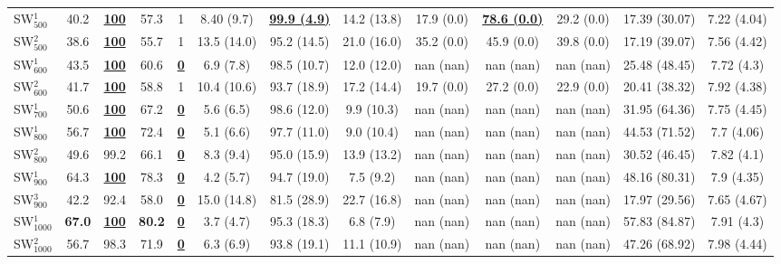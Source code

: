 \documentclass[a4paper,authoryear,review]{elsarticle}
\begin{document}
\begin{table}[]
\begin{adjustbox}{angle=90}
{\begin{tabular}{lcccccccccccc}
                SW$_{500}^{1}$ & 40.2 & {\ul \textbf{100}} & 57.3 & 1 & 8.40 (9.7) & {\ul \textbf{99.9 (4.9)}} & 14.2 (13.8) & 17.9 (0.0) & {\ul \textbf{78.6 (0.0)}} & 29.2 (0.0) & 17.39 (30.07) & 7.22 (4.04) \\
                SW$_{500}^{2}$ & 38.6 & {\ul \textbf{100}} & 55.7 & 1 & 13.5 (14.0) & 95.2 (14.5) & 21.0 (16.0) & 35.2 (0.0) & 45.9 (0.0) & 39.8 (0.0) & 17.19 (39.07) & 7.56 (4.42) \\
                SW$_{600}^{1}$ & 43.5 & {\ul \textbf{100}} & 60.6 & {\ul \textbf{0}} & 6.9 (7.8) & 98.5 (10.7) & 12.0 (12.0) & nan (nan) & nan (nan) & nan (nan) & 25.48 (48.45) & 7.72 (4.3) \\
                SW$_{600}^{2}$ & 41.7 & {\ul \textbf{100}} & 58.8 & 1 & 10.4 (10.6) & 93.7 (18.9) & 17.2 (14.4) & 19.7 (0.0) & 27.2 (0.0) & 22.9 (0.0) & 20.41 (38.32) & 7.92 (4.38) \\
                SW$_{700}^{1}$ & 50.6 & {\ul \textbf{100}} & 67.2 & {\ul \textbf{0}} & 5.6 (6.5) & 98.6 (12.0) & 9.9 (10.3) & nan (nan) & nan (nan) & nan (nan) & 31.95 (64.36) & 7.75 (4.45) \\
                SW$_{800}^{1}$ & 56.7 & {\ul \textbf{100}} & 72.4 & {\ul \textbf{0}} & 5.1 (6.6) & 97.7 (11.0) & 9.0 (10.4) & nan (nan) & nan (nan) & nan (nan) & 44.53 (71.52) & 7.7 (4.06) \\
                SW$_{800}^{2}$ & 49.6 & 99.2 & 66.1 & {\ul \textbf{0}} & 8.3 (9.4) & 95.0 (15.9) & 13.9 (13.2) & nan (nan) & nan (nan) & nan (nan) & 30.52 (46.45) & 7.82 (4.1) \\
                SW$_{900}^{1}$ & 64.3 & {\ul \textbf{100}} & 78.3 & {\ul \textbf{0}} & 4.2 (5.7) & 94.7 (19.0) & 7.5 (9.2) & nan (nan) & nan (nan) & nan (nan) & 48.16 (80.31) & 7.9 (4.35) \\
                SW$_{900}^{3}$ & 42.2 & 92.4 & 58.0 & {\ul \textbf{0}} & 15.0 (14.8) & 81.5 (28.9) & 22.7 (16.8) & nan (nan) & nan (nan) & nan (nan) & 17.97 (29.56) & 7.65 (4.67) \\
                SW$_{1000}^{1}$ & \textbf{67.0} & {\ul \textbf{100}} & \textbf{80.2} & {\ul \textbf{0}} & 3.7 (4.7) & 95.3 (18.3) & 6.8 (7.9) & nan (nan) & nan (nan) & nan (nan) & 57.83 (84.87) & 7.91 (4.3) \\
                SW$_{1000}^{2}$ & 56.7 & 98.3 & 71.9 & {\ul \textbf{0}} & 6.3 (6.9) & 93.8 (19.1) & 11.1 (10.9) & nan (nan) & nan (nan) & nan (nan) & 47.26 (68.92) & 7.98 (4.44) \\ \hline
            \end{tabular}     
}
\end{adjustbox}
\end{table}
\end{document}
